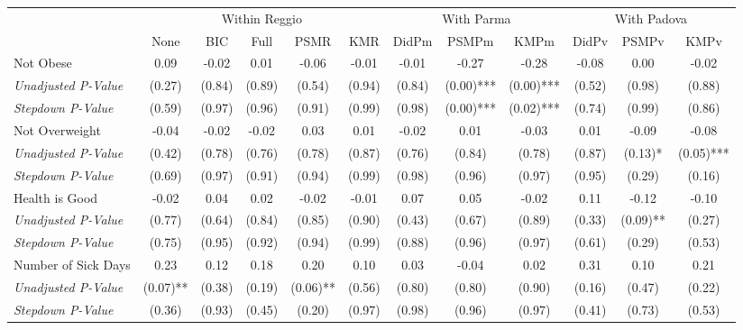 \begin{tabular}{l c c c c c c c c c c c}
\toprule
& \multicolumn{5}{c}{Within Reggio} & \multicolumn{3}{c}{With Parma} & \multicolumn{3}{c}{With Padova} \\\cmidrule(lr){2-6} \cmidrule(lr){7-9} \cmidrule(lr){10-12}
 & None & BIC & Full & PSMR & KMR & DidPm & PSMPm & KMPm & DidPv & PSMPv & KMPv \\
\midrule
Not Obese & 0.09 & -0.02 & 0.01 & -0.06 & -0.01 & -0.01 & -0.27 & -0.28 & -0.08 & 0.00 & -0.02 \\
\quad \textit{Unadjusted P-Value} & (0.27) & (0.84) & (0.89) & (0.54) & (0.94) & (0.84) & (0.00)*** & (0.00)*** & (0.52) & (0.98) & (0.88) \\
\quad \textit{Stepdown P-Value} & (0.59) & (0.97) & (0.96) & (0.91) & (0.99) & (0.98) & (0.00)*** & (0.02)*** & (0.74) & (0.99) & (0.86) \\
Not Overweight & -0.04 & -0.02 & -0.02 & 0.03 & 0.01 & -0.02 & 0.01 & -0.03 & 0.01 & -0.09 & -0.08 \\
\quad \textit{Unadjusted P-Value} & (0.42) & (0.78) & (0.76) & (0.78) & (0.87) & (0.76) & (0.84) & (0.78) & (0.87) & (0.13)* & (0.05)*** \\
\quad \textit{Stepdown P-Value} & (0.69) & (0.97) & (0.91) & (0.94) & (0.99) & (0.98) & (0.96) & (0.97) & (0.95) & (0.29) & (0.16) \\
Health is Good & -0.02 & 0.04 & 0.02 & -0.02 & -0.01 & 0.07 & 0.05 & -0.02 & 0.11 & -0.12 & -0.10 \\
\quad \textit{Unadjusted P-Value} & (0.77) & (0.64) & (0.84) & (0.85) & (0.90) & (0.43) & (0.67) & (0.89) & (0.33) & (0.09)** & (0.27) \\
\quad \textit{Stepdown P-Value} & (0.75) & (0.95) & (0.92) & (0.94) & (0.99) & (0.88) & (0.96) & (0.97) & (0.61) & (0.29) & (0.53) \\
Number of Sick Days & 0.23 & 0.12 & 0.18 & 0.20 & 0.10 & 0.03 & -0.04 & 0.02 & 0.31 & 0.10 & 0.21 \\
\quad \textit{Unadjusted P-Value} & (0.07)** & (0.38) & (0.19) & (0.06)** & (0.56) & (0.80) & (0.80) & (0.90) & (0.16) & (0.47) & (0.22) \\
\quad \textit{Stepdown P-Value} & (0.36) & (0.93) & (0.45) & (0.20) & (0.97) & (0.98) & (0.96) & (0.97) & (0.41) & (0.73) & (0.53) \\
\bottomrule
\end{tabular}
